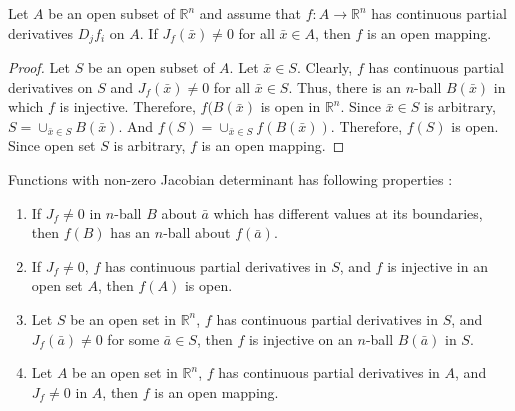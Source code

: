 \begin{theorem}
	Let $A$ be an open subset of $\mathbb{R}^n$ and assume that $f : A \to \mathbb{R}^n$ has continuous partial derivatives $D_jf_i$ on $A$.
	If $J_f(\bar{x}) \ne 0$ for all $\bar{x} \in A$, then $f$ is an open mapping.
\end{theorem}
\begin{proof}
	Let $S$ be an open subset of $A$.
	Let $\bar{x} \in S$.
	Clearly, $f$ has continuous partial derivatives on $S$ and $J_f(\bar{x}) \ne 0$ for all $\bar{x} \in S$.
	Thus, there is an $n$-ball $B(\bar{x})$ in which $f$ is injective.
	Therefore, $f(B(\bar{x})$ is open in $\mathbb{R}^n$.
	Since $\bar{x} \in S$ is arbitrary, $S = \cup_{\bar{x} \in S} B(\bar{x})$.
	And $f(S) = \cup_{\bar{x} \in S} f(B(\bar{x}))$.
	Therefore, $f(S)$ is open.
	Since open set $S$ is arbitrary, $f$ is an open mapping.
\end{proof}

\begin{commentary}
\begin{remark}[Properties]
	Functions with non-zero Jacobian determinant has following properties :
\begin{enumerate}
	\item If $J_f \ne 0$ in $n$-ball $B$ about $\bar{a}$ which has different values at its boundaries, then $f(B)$ has an $n$-ball about $f(\bar{a})$.
	\item If $J_f \ne 0$, $f$ has continuous partial derivatives in $S$, and $f$ is injective in an open set $A$, then $f(A)$ is open.
	\item Let $S$ be an open set in $\mathbb{R}^n$, $f$ has continuous partial derivatives in $S$, and $J_f(\bar{a}) \ne 0$ for some $\bar{a} \in S$, then $f$ is injective on an $n$-ball $B(\bar{a})$ in $S$.
	\item Let $A$ be an open set in $\mathbb{R}^n$, $f$ has continuous partial derivatives in $A$, and $J_f \ne 0$ in $A$, then $f$ is an open mapping.
\end{enumerate}
\end{remark}
\end{commentary}

